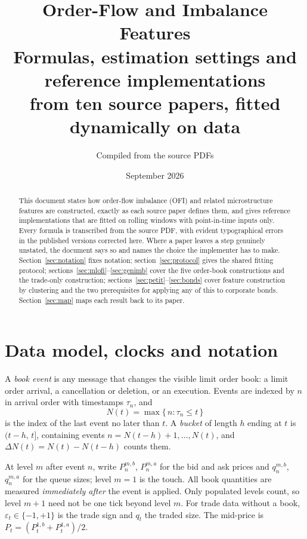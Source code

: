 \documentclass[11pt]{article}
\title{\textbf{Order-Flow and Imbalance Features}\\[4pt]
\large Formulas, estimation settings and reference implementations\\
from ten source papers, fitted dynamically on data}
\author{Compiled from the source PDFs}
\date{September 2026}
\begin{document}
\maketitle

\begin{abstract}
\noindent This document states how order-flow imbalance (OFI) and related
microstructure features are constructed, exactly as each source paper defines
them, and gives reference implementations that are fitted on rolling windows
with point-in-time inputs only. Every formula is transcribed from the source
PDF, with evident typographical errors in the published versions corrected
here. Where a paper leaves a step genuinely unstated, the document says so and
names the choice the implementer has to make.
Section~\ref{sec:notation} fixes notation; section~\ref{sec:protocol}
gives the shared fitting protocol; sections~\ref{sec:mlofi}--\ref{sec:genimb}
cover the five order-book constructions and the trade-only construction;
sections~\ref{sec:petit}--\ref{sec:bonds} cover feature construction by
clustering and the two prerequisites for applying any of this to corporate
bonds. Section~\ref{sec:map} maps each result back to its paper.
\end{abstract}

\tableofcontents

\section{Data model, clocks and notation}\label{sec:notation}

A \emph{book event} is any message that changes the visible limit order book: a
limit order arrival, a cancellation or deletion, or an execution. Events are
indexed by $n$ in arrival order with timestamps $\tau_n$, and
\[
  N(t)=\max\{\,n:\tau_n\le t\,\}
\]
is the index of the last event no later than $t$. A \emph{bucket} of length $h$
ending at $t$ is $(t-h,\,t]$, containing events $n=N(t-h)+1,\dots,N(t)$, and
$\Delta N(t)=N(t)-N(t-h)$ counts them.

At level $m$ after event $n$, write $P^{m,b}_{n}$, $P^{m,a}_{n}$ for the bid and
ask prices and $q^{m,b}_{n}$, $q^{m,a}_{n}$ for the queue sizes; level $m=1$ is
the touch. All book quantities are measured \emph{immediately after} the event
is applied. Only populated levels count, so level $m+1$ need not be one tick
beyond level $m$. For trade data without a book, $\varepsilon_t\in\{-1,+1\}$ is
the trade sign and $q_t$ the traded size. The mid-price is
$P_t=(P^{1,b}_t+P^{1,a}_t)/2$.
\end{document}
